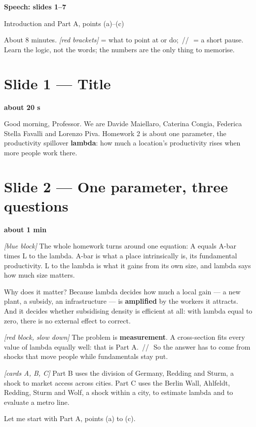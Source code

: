 \documentclass[11pt,a4paper]{article}
\newcommand{\slide}[2]{\Needspace{10\baselineskip}\section{#1}\textcolor{unicared}{\small\bfseries #2}\par}
\newcommand{\cue}[1]{{\small\itshape\color{unicared}[#1]}}
\newcommand{\pause}{\textcolor{unicared}{\,/\!/\,}}
\begin{document}
{\color{unicablue}\Huge\bfseries Speech: slides 1--7\par}
\vspace{2pt}
{\Large Introduction and Part A, points (a)--(c)\par}
\vspace{4pt}
{\small About 8 minutes. \cue{red brackets} = what to point at or do; \pause\ = a short pause. Learn the logic, not the words; the numbers are the only thing to memorise.}

\slide{Slide 1 --- Title}{about 20 s}
\begin{say}
Good morning, Professor. We are Davide Maiellaro, Caterina Congia, Federica Stella Favalli and Lorenzo Piva. Homework 2 is about one parameter, the productivity spillover \textbf{lambda}: how much a location's productivity rises when more people work there.
\end{say}

\slide{Slide 2 --- One parameter, three questions}{about 1 min}
\begin{say}
\cue{blue block} The whole homework turns around one equation: A equals A-bar times L to the lambda. A-bar is what a place intrinsically is, its fundamental productivity. L to the lambda is what it gains from its own size, and lambda says how much size matters.

Why does it matter? Because lambda decides how much a local gain --- a new plant, a subsidy, an infrastructure --- is \textbf{amplified} by the workers it attracts. And it decides whether subsidising density is efficient at all: with lambda equal to zero, there is no external effect to correct.

\cue{red block, slow down} The problem is \textbf{measurement}. A cross-section fits every value of lambda equally well: that is Part A. \pause\ So the answer has to come from shocks that move people while fundamentals stay put.

\cue{cards A, B, C} Part B uses the division of Germany, Redding and Sturm, a shock to market access across cities. Part C uses the Berlin Wall, Ahlfeldt, Redding, Sturm and Wolf, a shock within a city, to estimate lambda and to evaluate a metro line.

Let me start with Part A, points (a) to (c).
\end{say}
\end{document}
